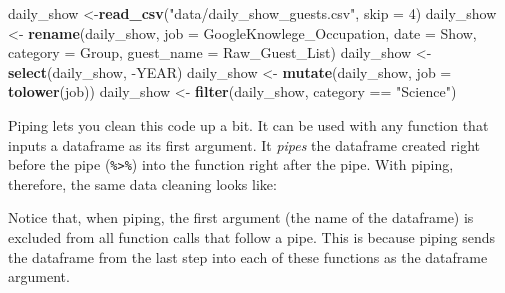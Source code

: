 \documentclass[]{book}
\makeatletter
\newenvironment{Shaded}{\begin{snugshade}}{\end{snugshade}}
\newcommand{\KeywordTok}[1]{\textcolor[rgb]{0.13,0.29,0.53}{\textbf{{#1}}}}
\newcommand{\DataTypeTok}[1]{\textcolor[rgb]{0.13,0.29,0.53}{{#1}}}
\newcommand{\DecValTok}[1]{\textcolor[rgb]{0.00,0.00,0.81}{{#1}}}
\newcommand{\StringTok}[1]{\textcolor[rgb]{0.31,0.60,0.02}{{#1}}}
\newcommand{\NormalTok}[1]{{#1}}
\newenvironment{kframe}{%
\medskip{}
\setlength{\fboxsep}{.8em}
 \def\at@end@of@kframe{}%
 \ifinner\ifhmode%
  \def\at@end@of@kframe{\end{minipage}}%
  \begin{minipage}{\columnwidth}%
 \fi\fi%
 \def\FrameCommand##1{\hskip\@totalleftmargin \hskip-\fboxsep
 \colorbox{shadecolor}{##1}\hskip-\fboxsep
     \hskip-\linewidth \hskip-\@totalleftmargin \hskip\columnwidth}%
 \MakeFramed {\advance\hsize-\width
   \@totalleftmargin\z@ \linewidth\hsize
   \@setminipage}}%
 {\par\unskip\endMakeFramed%
 \at@end@of@kframe}
\renewenvironment{Shaded}{\begin{kframe}}{\end{kframe}}
\makeatother
\begin{document}
\begin{Shaded}
\begin{Highlighting}[]
\NormalTok{daily_show <-}\KeywordTok{read_csv}\NormalTok{(}\StringTok{"data/daily_show_guests.csv"}\NormalTok{,}
                      \DataTypeTok{skip =} \DecValTok{4}\NormalTok{)}
\NormalTok{daily_show <-}\StringTok{ }\KeywordTok{rename}\NormalTok{(daily_show, }
                     \DataTypeTok{job =} \NormalTok{GoogleKnowlege_Occupation,}
                     \DataTypeTok{date =} \NormalTok{Show,}
                     \DataTypeTok{category =} \NormalTok{Group,}
                     \DataTypeTok{guest_name =} \NormalTok{Raw_Guest_List)}
\NormalTok{daily_show <-}\StringTok{ }\KeywordTok{select}\NormalTok{(daily_show, -YEAR) }
\NormalTok{daily_show <-}\StringTok{ }\KeywordTok{mutate}\NormalTok{(daily_show, }\DataTypeTok{job =} \KeywordTok{tolower}\NormalTok{(job))}
\NormalTok{daily_show <-}\StringTok{ }\KeywordTok{filter}\NormalTok{(daily_show, category ==}\StringTok{ "Science"}\NormalTok{)}
\end{Highlighting}
\end{Shaded}

Piping lets you clean this code up a bit. It can be used with any
function that inputs a dataframe as its first argument. It \emph{pipes}
the dataframe created right before the pipe
(\texttt{\%\textgreater{}\%}) into the function right after the pipe.
With piping, therefore, the same data cleaning looks like:

\begin{Shaded}
\end{Shaded}

Notice that, when piping, the first argument (the name of the dataframe)
is excluded from all function calls that follow a pipe. This is because
piping sends the dataframe from the last step into each of these
functions as the dataframe argument.
\end{document}

